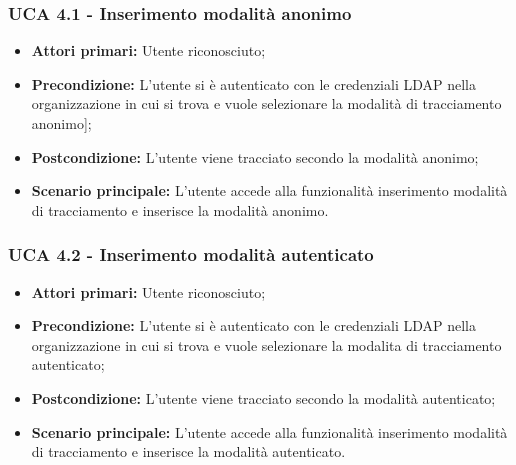 \subsubsection{UCA 4.1 - Inserimento modalità anonimo}%
\begin{itemize}
\item \textbf{Attori primari:} Utente riconosciuto;
\item \textbf{Precondizione:} L'utente si è autenticato con le credenziali LDAP nella organizzazione in cui si trova e vuole selezionare la modalità di tracciamento anonimo];
\item \textbf{Postcondizione:}  L'utente viene tracciato secondo la modalità anonimo;
\item \textbf{Scenario principale:} L'utente accede alla funzionalità inserimento modalità di tracciamento e inserisce la modalità anonimo.
\end{itemize}

\subsubsection{UCA 4.2 - Inserimento modalità autenticato}%
\begin{itemize}
	\item \textbf{Attori primari:} Utente riconosciuto;
	\item \textbf{Precondizione:} L'utente si è autenticato con le credenziali LDAP nella organizzazione in cui si trova e vuole selezionare la modalita di tracciamento autenticato;
	\item \textbf{Postcondizione:}  L'utente viene tracciato secondo la modalità autenticato;
	\item \textbf{Scenario principale:} L'utente accede alla funzionalità inserimento modalità di tracciamento e inserisce la modalità autenticato.
\end{itemize}
